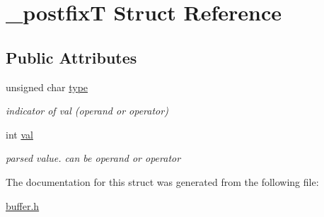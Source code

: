 \hypertarget{struct__postfixT}{}\section{\+\_\+postfixT Struct Reference}
\label{struct__postfixT}
\subsection*{Public Attributes}
\begin{DoxyCompactItemize}
\item 
\mbox{\label{struct__postfixT_abacd1f3ad11863648b7cad9468b9a553}} 
unsigned char \hyperlink{struct__postfixT_abacd1f3ad11863648b7cad9468b9a553}{type}
\begin{DoxyCompactList}\small\item\em indicator of val (operand or operator) \end{DoxyCompactList}\item 
\mbox{\label{struct__postfixT_a24792160eddf33cb6f2e6a9b1e7945e4}} 
int \hyperlink{struct__postfixT_a24792160eddf33cb6f2e6a9b1e7945e4}{val}
\begin{DoxyCompactList}\small\item\em parsed value. can be operand or operator \end{DoxyCompactList}\end{DoxyCompactItemize}


The documentation for this struct was generated from the following file\+:\begin{DoxyCompactItemize}
\item 
\hyperlink{buffer_8h}{buffer.\+h}\end{DoxyCompactItemize}
